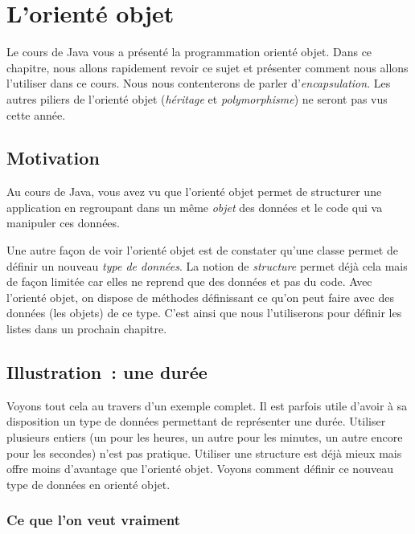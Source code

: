 \chapter{L'orienté objet}

	Le cours de Java vous a présenté la programmation orienté objet.
	Dans ce chapitre, nous allons rapidement revoir ce sujet
	et présenter comment nous allons l'utiliser dans ce cours.
	Nous nous contenterons de parler d'\textit{encapsulation}. 
	Les autres piliers de l'orienté objet 
	(\textit{héritage} et \textit{polymorphisme}) 
	ne seront pas vus cette année.

\section{Motivation}

	Au cours de Java,
	vous avez vu que l'orienté objet permet de structurer une
	application en regroupant dans un même \emph{objet}
	des données et le code qui va manipuler ces données.
	
	Une autre façon de voir l'orienté objet
	est de constater qu'une classe permet de définir 
	un nouveau \emph{type de données}.
	La notion de \emph{structure} permet déjà cela mais de façon limitée
	car elles ne reprend que des données et pas du code.
	Avec l'orienté objet, 
	on dispose de méthodes définissant ce qu'on peut faire avec des données
	(les objets) de ce type.
	C'est ainsi que nous l'utiliserons pour définir les listes 
	dans un prochain chapitre.

	
\section{Illustration~: une durée}

	Voyons tout cela au travers d'un exemple complet.
	Il est parfois utile d'avoir à sa disposition un type
	de données permettant de représenter une durée.	
	Utiliser plusieurs entiers (un pour les heures, un autre pour les minutes,
	un autre encore pour les secondes) n'est pas pratique.
	Utiliser une structure est déjà mieux mais offre moins d'avantage
	que l'orienté objet.	
	Voyons comment définir ce nouveau type de données en orienté objet.
	
	\subsection{Ce que l’on veut vraiment}
	
